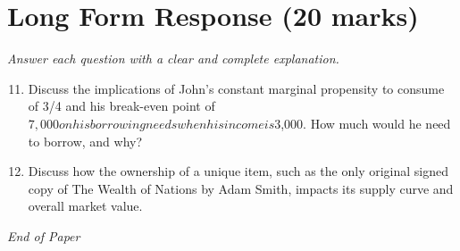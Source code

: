 \documentclass[12pt]{article}
\begin{document}
\section*{Long Form Response (20 marks)}
\textit{Answer each question with a clear and complete explanation.}
\begin{enumerate}[label=\arabic*.]
\setcounter{enumi}{10}
\item Discuss the implications of John's constant marginal propensity to consume of 3/4 and his break-even point of $7,000 on his borrowing needs when his income is $3,000. How much would he need to borrow, and why?
\item Discuss how the ownership of a unique item, such as the only original signed copy of The Wealth of Nations by Adam Smith, impacts its supply curve and overall market value.
\end{enumerate}

\vfill
\noindent\textit{End of Paper}
\end{document}
